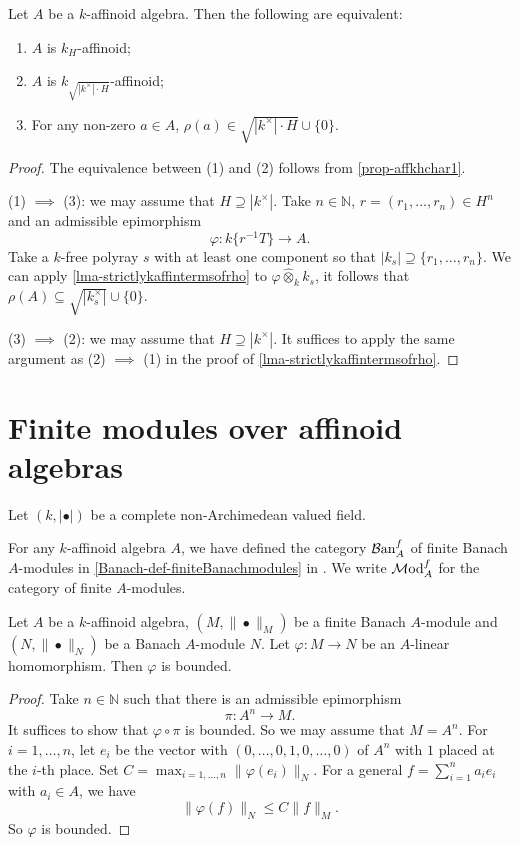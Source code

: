 \begin{thm}\label{thm-strictaffdfnequal}
    Let $A$ be a $k$-affinoid algebra. Then the following are equivalent:
    \begin{enumerate}
        \item $A$ is $k_H$-affinoid;
        \item $A$ is $k_{\sqrt{|k^{\times}|\cdot H}}$-affinoid;
        \item For any non-zero $a\in A$, $\rho(a)\in \sqrt{|k^{\times}|\cdot H}\cup\{0\}$.
    \end{enumerate}
\end{thm}
\begin{proof}
    The equivalence between (1) and (2) follows from \cref{prop-affkhchar1}.

    (1) $\implies$ (3): we may assume that $H\supseteq |k^{\times}|$. Take $n\in \mathbb{N}$, $r=(r_1,\ldots,r_n)\in H^n$ and an admissible epimorphism 
    \[
        \varphi:k\{r^{-1}T\} \rightarrow A. 
    \]
    Take a $k$-free polyray $s$ with at least one component so that $|k_s|\supseteq \{r_1,\ldots,r_n\}$. We can apply \cref{lma-strictlykaffintermsofrho} to $\varphi\hat{\otimes}_k k_s$, it follows that $\rho(A)\subseteq \sqrt{|k_s^{\times}|}\cup \{0\}$.

    (3) $\implies$ (2): we may assume that $H\supseteq |k^{\times}|$. It suffices to apply the same argument as (2) $\implies$ (1) in the proof of \cref{lma-strictlykaffintermsofrho}.

\end{proof}


\section{Finite modules over affinoid algebras}
Let $(k,|\bullet|)$ be a complete non-Archimedean valued field. 

For any $k$-affinoid algebra $A$, we have defined the category $\mathcal{B}\mathrm{an}_A^f$ of finite Banach $A$-modules in \cref{Banach-def-finiteBanachmodules} in . We write $\mathcal{M}\mathrm{od}_A^f$ for the category of finite $A$-modules. 

\begin{lemma}\label{lma-finiteBanachmodulemapbdd}
    Let $A$ be a $k$-affinoid algebra, $(M,\|\bullet\|_M)$ be a finite Banach $A$-module and $(N,\|\bullet\|_N)$ be a Banach $A$-module $N$.
    Let $\varphi:M\rightarrow N$ be an $A$-linear homomorphism. Then $\varphi$ is bounded.
\end{lemma}
\begin{proof}
    Take $n\in \mathbb{N}$ such that there is an admissible epimorphism 
    \[
        \pi:A^n\rightarrow M.  
    \]   
    It suffices to show that $\varphi\circ\pi$ is bounded. So we may assume that $M=A^n$. For $i=1,\ldots,n$, let $e_i$ be the vector with $(0,\ldots,0,1,0,\ldots,0)$ of $A^n$ with $1$ placed at the $i$-th place.
    Set $C=\max_{i=1,\ldots,n} \|\varphi(e_i)\|_N$. For a general $f=\sum_{i=1}^n a_i e_i$ with $a_i\in A$, we have
    \[
        \|\varphi(f)\|_N\leq C\|f\|_M.
    \]
    So $\varphi$ is bounded.
\end{proof}

